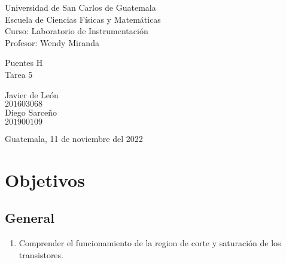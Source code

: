 \documentclass[conference]{IEEEtran}
\begin{document}
\begin{titlepage}



\begin{flushleft}
    Universidad de San Carlos de Guatemala \\
    Escuela de Ciencias Físicas y Matemáticas \\
    Curso: Laboratorio de Instrumentación \\
    Profesor: Wendy Miranda
\end{flushleft}

\vspace{6cm}

\begin{center}
    \huge{Puentes H} \\[1cm]
    \large{Tarea 5}
\end{center}

\vspace{9.75cm}

\begin{flushright}
	Javier de León \\
    $201603068$ \\
    Diego Sarceño \\
    $201900109$
\end{flushright}

\vspace{0.5cm}

\begin{center}
    Guatemala, 11 de noviembre del 2022
\end{center}

\end{titlepage}



\begin{abstract}
    
\end{abstract}

\begin{IEEEkeywords}
    
\end{IEEEkeywords}

\section{Objetivos}

\subsection{General}
    \begin{enumerate}[1.]
        \item Comprender el funcionamiento de la region de corte y saturación de los transistores.
    \end{enumerate}
\end{document}
